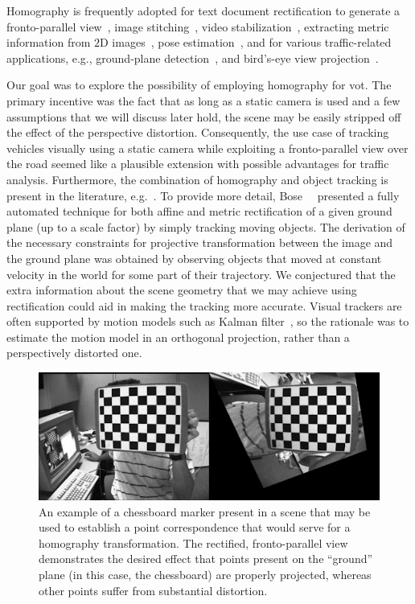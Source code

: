 Homography is frequently adopted for text document rectification to generate a fronto-parallel view~\cite{lu2005perspective, miao2006perspective}, image stitching~\cite{adel2014image, gao2011constructing}, video stabilization~\cite{liu2015smooth}, extracting metric information from $2$D images~\cite{zhang2000flexible}, pose estimation~\cite{mariyanayagam2018poseestim}, and for various traffic-related applications, e.g., ground-plane detection~\cite{arrospide2010homography}, and bird's-eye view projection~\cite{luo2010low}.

Our goal was to explore the possibility of employing homography for \gls{vot}. The primary incentive was the fact that as long as a static camera is used and a few assumptions that we will discuss later hold, the scene may be easily stripped off the effect of the perspective distortion. Consequently, the use case of tracking vehicles visually using a static camera while exploiting a fronto-parallel view over the road seemed like a plausible extension with possible advantages for traffic analysis. Furthermore, the combination of homography and object tracking is present in the literature, e.g.~\cite{bose2004groundplane, zhang2012homographytrack, Mei2009}. To provide more detail, Bose~\etal{}~\cite{bose2004groundplane} presented a fully automated technique for both affine and metric rectification of a given ground plane (up to a scale factor) by simply tracking moving objects. The derivation of the necessary constraints for projective transformation between the image and the ground plane was obtained by observing objects that moved at constant velocity in the world for some part of their trajectory. We conjectured that the extra information about the scene geometry that we may achieve using rectification could aid in making the tracking more accurate. Visual trackers are often supported by motion models such as Kalman filter~\cite{kalman1960linearfilter}, so the rationale was to estimate the motion model in an orthogonal projection, rather than a perspectively distorted one.

\begin{figure}[t]
  \centerline{\includegraphics[width=\linewidth]{figures/homography/chessboard_marker.jpg}}
  \caption[Chessboard marker]{An example of a chessboard marker present in a scene that may be used to establish a point correspondence that would serve for a homography transformation. The rectified, fronto-parallel view demonstrates the desired effect that points present on the ``ground'' plane (in this case, the chessboard) are properly projected, whereas other points suffer from substantial distortion. }
  \label{fig:ChessboardMarker}
\end{figure}

